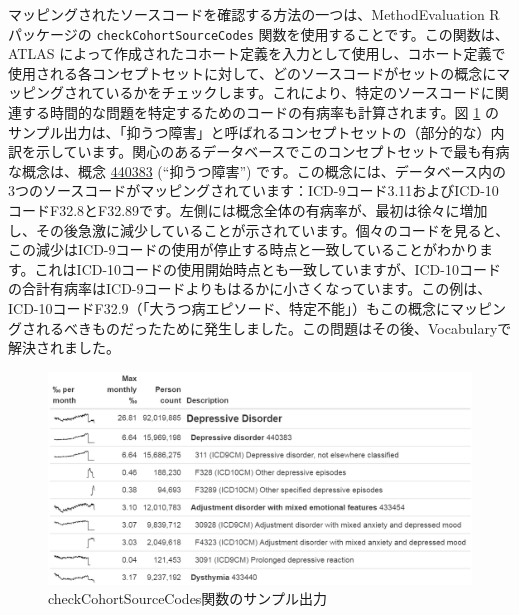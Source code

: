 \documentclass[
  11pt]{book}
\theoremstyle{definition}
\theoremstyle{definition}
\theoremstyle{definition}
\theoremstyle{definition}
\theoremstyle{remark}
\begin{document}
マッピングされたソースコードを確認する方法の一つは、MethodEvaluation R パッケージの \texttt{checkCohortSourceCodes} 関数を使用することです。この関数は、ATLAS によって作成されたコホート定義を入力として使用し、コホート定義で使用される各コンセプトセットに対して、どのソースコードがセットの概念にマッピングされているかをチェックします。これにより、特定のソースコードに関連する時間的な問題を特定するためのコードの有病率も計算されます。図 \ref{fig:sourceCodes} のサンプル出力は、「抑うつ障害」と呼ばれるコンセプトセットの（部分的な）内訳を示しています。関心のあるデータベースでこのコンセプトセットで最も有病な概念は、概念 \href{http://athena.ohdsi.org/search-terms/terms/440383}{440383} (``抑うつ障害'') です。この概念には、データベース内の3つのソースコードがマッピングされています：ICD-9コード3.11およびICD-10コードF32.8とF32.89です。左側には概念全体の有病率が、最初は徐々に増加し、その後急激に減少していることが示されています。個々のコードを見ると、この減少はICD-9コードの使用が停止する時点と一致していることがわかります。これはICD-10コードの使用開始時点とも一致していますが、ICD-10コードの合計有病率はICD-9コードよりもはるかに小さくなっています。この例は、ICD-10コードF32.9（「大うつ病エピソード、特定不能」）もこの概念にマッピングされるべきものだったために発生しました。この問題はその後、Vocabularyで解決されました。

\begin{figure}

{\centering \includegraphics[width=1\linewidth]{images/DataQuality/sourceCodes} 

}

\caption{checkCohortSourceCodes関数のサンプル出力}\label{fig:sourceCodes}
\end{figure}
\end{document}
